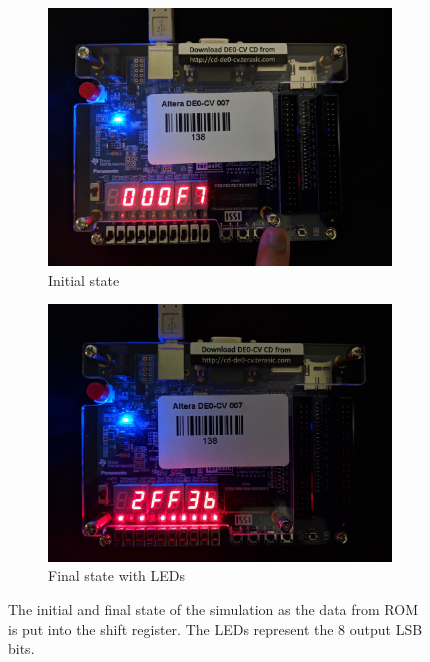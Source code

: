 \documentclass[letterpaper, 12pt]{article} %
\begin{document}
\begin{figure}[ht]
\centering
\begin{subfigure}{.5\textwidth}
  \centering
  \includegraphics[width=0.99\linewidth]{files/add_zero}
  \caption{Initial state}
  \label{fpga1}
\end{subfigure}%
\begin{subfigure}{.5\textwidth}
  \centering
  \includegraphics[width=0.99\linewidth]{files/add_2ff}
  \caption{Final state with LEDs}
  \label{fpga2}
\end{subfigure}
\caption{The initial and final state of the simulation as the data from ROM is put into the shift register. The LEDs represent the 8 output LSB bits.}
\label{fig:init}
\end{figure}
\end{document}
